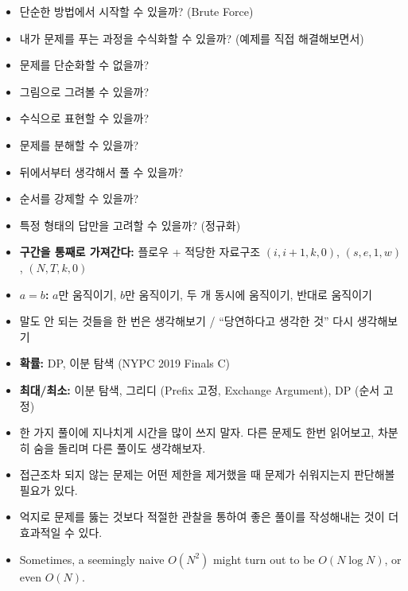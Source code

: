 \begin{itemize}
    \item 단순한 방법에서 시작할 수 있을까? (Brute Force)
    \item 내가 문제를 푸는 과정을 수식화할 수 있을까? (예제를 직접 해결해보면서)
    \item 문제를 단순화할 수 없을까?
    \item 그림으로 그려볼 수 있을까?
    \item 수식으로 표현할 수 있을까?
    \item 문제를 분해할 수 있을까?
    \item 뒤에서부터 생각해서 풀 수 있을까?
    \item 순서를 강제할 수 있을까?
    \item 특정 형태의 답만을 고려할 수 있을까? (정규화)
    \item \textbf{구간을 통째로 가져간다:} 플로우 + 적당한 자료구조 $(i, i + 1, k, 0)$, $(s, e, 1, w)$, $(N, T, k, 0)$
    \item \textbf{$a = b$:} $a$만 움직이기, $b$만 움직이기, 두 개 동시에 움직이기, 반대로 움직이기
    \item 말도 안 되는 것들을 한 번은 생각해보기 / ``당연하다고 생각한 것'' 다시 생각해보기
    \item \textbf{확률:} DP, 이분 탐색 (NYPC 2019 Finals C)
    \item \textbf{최대/최소:} 이분 탐색, 그리디 (Prefix 고정, Exchange Argument), DP (순서 고정)
    \item 한 가지 풀이에 지나치게 시간을 많이 쓰지 말자. 다른 문제도 한번 읽어보고, 차분히 숨을 돌리며 다른 풀이도 생각해보자.
    \item 접근조차 되지 않는 문제는 어떤 제한을 제거했을 때 문제가 쉬워지는지 판단해볼 필요가 있다.
    \item 억지로 문제를 뚫는 것보다 적절한 관찰을 통하여 좋은 풀이를 작성해내는 것이 더 효과적일 수 있다.
    \item Sometimes, a seemingly naive $O(N^2)$ might turn out to be $O(N \log N)$, or even $O(N)$.
\end{itemize}